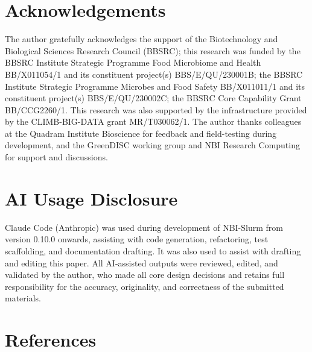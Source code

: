 \documentclass[
]{article}
\begin{document}
\section{Acknowledgements}\label{acknowledgements}

The author gratefully acknowledges the support of the Biotechnology and
Biological Sciences Research Council (BBSRC); this research was funded
by the BBSRC Institute Strategic Programme Food Microbiome and Health
BB/X011054/1 and its constituent project(s) BBS/E/QU/230001B; the BBSRC
Institute Strategic Programme Microbes and Food Safety BB/X011011/1 and
its constituent project(s) BBS/E/QU/230002C; the BBSRC Core Capability
Grant BB/CCG2260/1. This research was also supported by the
infrastructure provided by the CLIMB-BIG-DATA grant MR/T030062/1. The
author thanks colleagues at the Quadram Institute Bioscience for
feedback and field-testing during development, and the GreenDISC working
group and NBI Research Computing for support and discussions.

\section{AI Usage Disclosure}\label{ai-usage-disclosure}

Claude Code (Anthropic) was used during development of NBI-Slurm from
version 0.10.0 onwards, assisting with code generation, refactoring,
test scaffolding, and documentation drafting. It was also used to assist
with drafting and editing this paper. All AI-assisted outputs were
reviewed, edited, and validated by the author, who made all core design
decisions and retains full responsibility for the accuracy, originality,
and correctness of the submitted materials.

\section*{References}\label{references}
\end{document}
